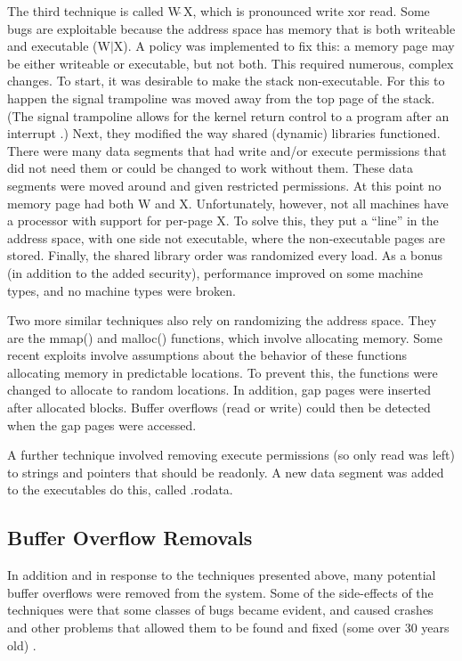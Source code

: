 \documentclass[12pt]{article}
\begin{document}
{The third technique is called W$\widehat{\ }$X, which is pronounced write xor read. Some bugs are exploitable because the address space has memory that is both writeable and executable (W$|$X). A policy was implemented to fix this: a memory page may be either writeable or executable, but not both. This required numerous, complex changes. To start, it was desirable to make the stack non-executable. For this to happen the signal trampoline was moved away from the top page of the stack. (The signal trampoline allows for the kernel return control to a program after an interrupt \cite{signal-trampoline}.) Next, they modified the way shared (dynamic) libraries functioned. There were many data segments that had write and/or execute permissions that did not need them or could be changed to work without them. These data segments were moved around and given restricted permissions. At this point no memory page had both W and X. Unfortunately, however, not all machines have a processor with support for per-page X. To solve this, they put a ``line'' in the address space, with one side not executable, where the non-executable pages are stored. Finally, the shared library order was randomized every load. As a bonus (in addition to the added security), performance improved on some machine types, and no machine types were broken. \cite{exploit-mitigation}

Two more similar techniques also rely on randomizing the address space. They are the mmap() and malloc() functions, which involve allocating memory. Some recent exploits involve assumptions about the behavior of these functions allocating memory in predictable locations. To prevent this, the functions were changed to allocate to random locations. In addition, gap pages were inserted after allocated blocks. Buffer overflows (read or write) could then be detected when the gap pages were accessed. \cite{exploit-mitigation}

A further technique involved removing execute permissions (so only read was left) to strings and pointers that should be readonly. A new data segment was added to the executables do this, called .rodata. \cite{exploit-mitigation}

\subsection*{Buffer Overflow Removals}

In addition and in response to the techniques presented above, many potential buffer overflows were removed from the system. Some of the side-effects of the techniques were that some classes of bugs became evident, and caused crashes and other problems that allowed them to be found and fixed (some over 30 years old) \cite{otto-malloc}.

}
\end{document}

